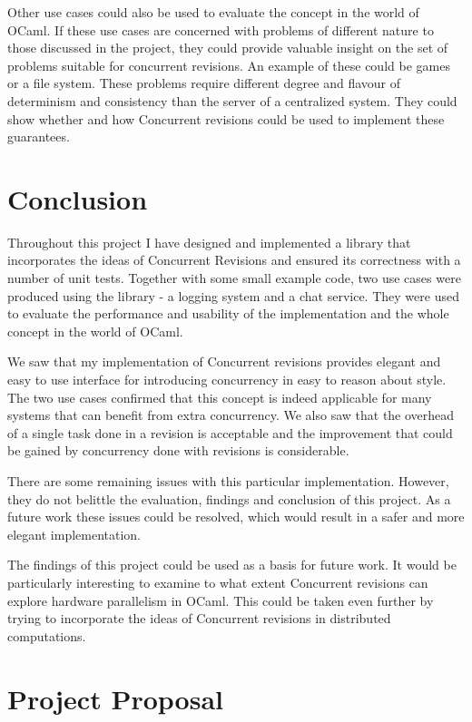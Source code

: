 \documentclass[12pt,twoside,notitlepage]{report}
\begin{document}
Other use cases could also be used to evaluate the concept in the world of OCaml. If these use cases are concerned with problems of different nature to those discussed in the project, they could provide valuable insight on the set of problems suitable for concurrent revisions. An example of these could be games or a file system. These problems require different degree and flavour of determinism and consistency than the server of a centralized system. They could show whether and how Concurrent revisions could be used to implement these guarantees. 

\cleardoublepage
\chapter{Conclusion}

Throughout this project I have designed and implemented a library that incorporates the ideas of Concurrent Revisions and ensured its correctness with a number of unit tests. Together with some small example code, two use cases were produced using the library - a logging system and a chat service. They were used to evaluate the performance and usability of the implementation and the whole concept in the world of OCaml.

We saw that my implementation of Concurrent revisions provides elegant and easy to use interface for introducing concurrency in easy to reason about style. The two use cases confirmed that this concept is indeed applicable for many systems that can benefit from extra concurrency. We also saw that the overhead of a single task done in a revision is acceptable and the improvement that could be gained by concurrency done with revisions is considerable.

There are some remaining issues with this particular implementation. However, they do not belittle the evaluation, findings and conclusion of this project. As a future work these issues could be resolved, which would result in a safer and more elegant implementation.

The findings of this project could be used as a basis for future work. It would be particularly interesting to examine to what extent Concurrent revisions can explore hardware parallelism in OCaml. This could be taken even further by trying to incorporate the ideas of Concurrent revisions in distributed computations.       


\cleardoublepage


 
\cleardoublepage 
\nocite{*}
\appendix


\chapter{Project Proposal}


\end{document}
